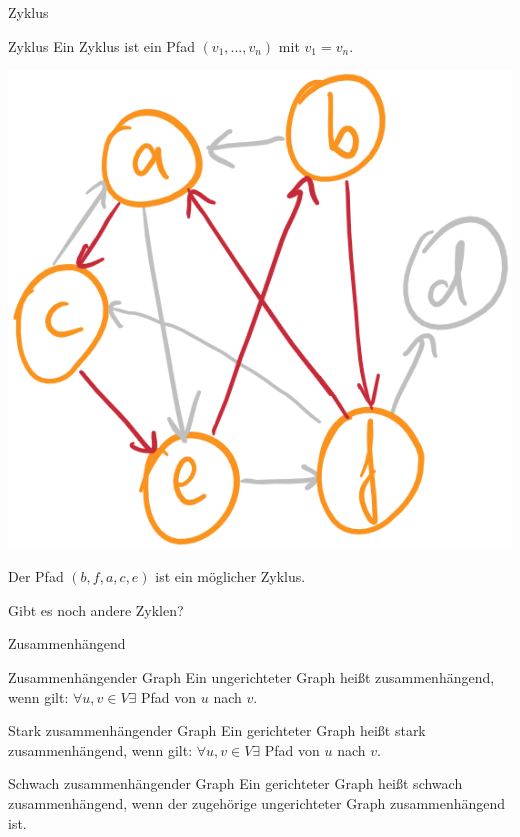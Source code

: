 \begin{frame}{Zyklus}
	\begin{block}{Zyklus}
		\ip Ein Zyklus ist ein Pfad $(v_1, ..., v_n)$ mit $v_1 = v_n$.
	\end{block}
	\bp
	\includegraphics[scale=0.3]{images/graph_zyklus.png}
	
	\ip Der Pfad $(b,f,a,c,e)$ ist ein möglicher Zyklus.
	
	\ip Gibt es noch andere Zyklen?
\end{frame}

\begin{frame}{Zusammenhängend}


	\bp
	
	\begin{block}{Zusammenhängender Graph}
		Ein ungerichteter Graph heißt zusammenhängend, wenn gilt: $\forall u,v \in V \exists$ Pfad von $u$ nach $v$.
	\end{block}

	\bp

	\begin{block}{Stark zusammenhängender Graph}
		Ein gerichteter Graph heißt stark zusammenhängend, wenn gilt: $\forall u,v \in V \exists$ Pfad von $u$ nach $v$.
	\end{block}

	\bp
	
	\begin{block}{Schwach zusammenhängender Graph}
	Ein gerichteter Graph heißt schwach zusammenhängend, wenn der zugehörige ungerichteter Graph zusammenhängend ist.
	\end{block}
\end{frame}

